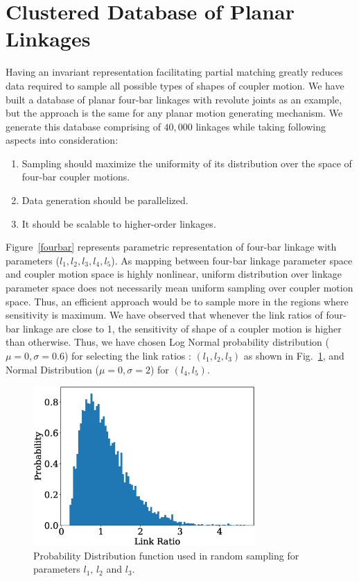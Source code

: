 \section{Clustered Database of Planar Linkages}\label{sec_db_ae}

Having an invariant representation facilitating partial matching greatly reduces data required to sample all possible types of shapes of coupler motion.
We have built a database of planar four-bar linkages with revolute joints as an example, but the approach is the same for any planar motion generating mechanism.
We generate this database comprising of $40,000$ linkages while taking following aspects into consideration:
\begin{enumerate}
  \item Sampling should maximize the uniformity of its distribution over the space of four-bar coupler motions.
  \item Data generation should be parallelized.
  \item It should be scalable to higher-order linkages.
\end{enumerate}
Figure~\ref{fourbar} represents parametric representation of four-bar linkage with parameters ($l_1,l_2,l_3,l_4,l_5$).
As mapping between four-bar linkage parameter space and coupler motion space is highly nonlinear, uniform distribution over linkage parameter space does not necessarily mean uniform sampling over coupler motion space.
Thus, an efficient approach would be to sample more in the regions where sensitivity is maximum.
We have observed that whenever the link ratios of four-bar linkage are close to 1, the sensitivity of shape of a coupler motion is higher than otherwise.
Thus, we have chosen Log Normal probability distribution ($\mu = 0,\sigma = 0.6 $) for selecting the link ratios : $(l_1, l_2, l_3)$ as shown in Fig.~\ref{logNormal}, and Normal Distribution ($\mu = 0,\sigma = 2 $) for $(l_4, l_5)$.

\begin{figure}
\centering
\includegraphics[width=240pt]{jcise-18/figure/fig_logNormal.eps}
  \caption{Probability Distribution function used in random sampling for parameters $l_1$, $l_2$ and $l_3$.}
\label{logNormal}
\end{figure}

